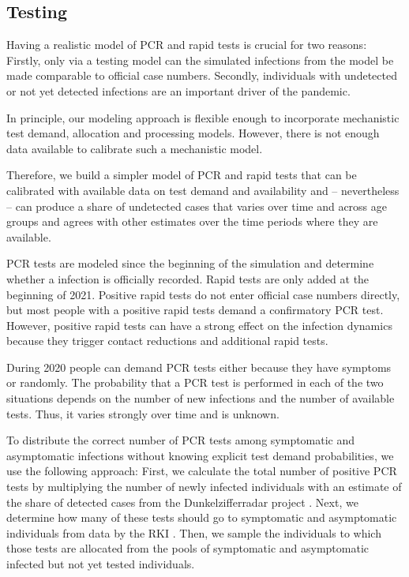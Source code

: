 \subsection{Testing} %
\label{sub:testing}

Having a realistic model of PCR and rapid tests is crucial for two reasons: Firstly, only
via a testing model can the simulated infections from the model be made comparable to
official case numbers. Secondly, individuals with undetected or not yet detected
infections are an important driver of the pandemic.

In principle, our modeling approach is flexible enough to incorporate mechanistic test
demand, allocation and processing models. However, there is not enough data available to
calibrate such a mechanistic model.

Therefore, we build a simpler model of PCR and rapid tests that can be calibrated with
available data on test demand and availability and -- nevertheless
-- can produce a share of undetected cases that varies over time and across age groups
and agrees with other estimates over the time periods where they are available.

PCR tests are modeled since the beginning of the simulation and determine whether a
infection is officially recorded. Rapid tests are only added at the beginning of 2021.
Positive rapid tests do not enter official case numbers directly, but most people with a
positive rapid tests demand a confirmatory PCR test. However, positive rapid tests can
have a strong effect on the infection dynamics because they trigger contact reductions
and additional rapid tests.

During 2020 people can demand PCR tests either because they have symptoms or randomly.
The probability that a PCR test is performed in each of the two situations depends on the
number of new infections and the number of available tests. Thus, it varies strongly over
time and is unknown.

To distribute the correct number of PCR tests among symptomatic and asymptomatic
infections without knowing explicit test demand probabilities, we use the following
approach: First, we calculate the total number of positive PCR tests by multiplying the
number of newly infected individuals with an estimate of the share of detected cases
from the Dunkelzifferradar project \citep{Dunkelzifferradar2020}. Next, we determine how
many of these tests should go to symptomatic and asymptomatic individuals from data by
the RKI \citep{ARS2020}. Then, we sample the individuals to which those tests
are allocated from the pools of symptomatic and asymptomatic infected but not yet tested
individuals.

